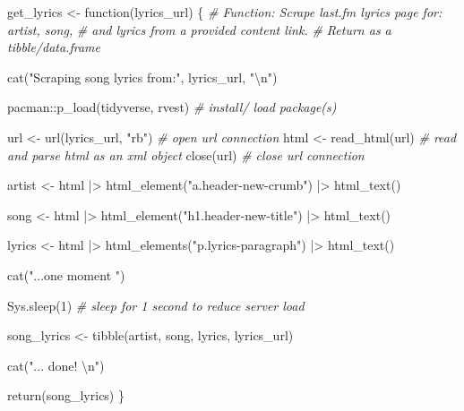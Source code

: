 \documentclass[
  letterpaper,
]{scrbook}
\newenvironment{Shaded}{\begin{snugshade}}{\end{snugshade}}
\newcommand{\CommentTok}[1]{\textcolor[rgb]{0.00,0.00,0.00}{\textit{#1}}}
\newcommand{\ControlFlowTok}[1]{\textcolor[rgb]{0.00,0.00,0.00}{#1}}
\newcommand{\DecValTok}[1]{\textcolor[rgb]{0.00,0.00,0.00}{#1}}
\newcommand{\FunctionTok}[1]{\textcolor[rgb]{0.00,0.00,0.00}{#1}}
\newcommand{\NormalTok}[1]{\textcolor[rgb]{0.00,0.00,0.00}{#1}}
\newcommand{\OtherTok}[1]{\textcolor[rgb]{0.00,0.00,0.00}{#1}}
\newcommand{\SpecialCharTok}[1]{\textcolor[rgb]{0.00,0.00,0.00}{#1}}
\newcommand{\StringTok}[1]{\textcolor[rgb]{0.00,0.00,0.00}{#1}}
\begin{document}
\begin{Shaded}
\begin{Highlighting}[]
\NormalTok{get\_lyrics }\OtherTok{\textless{}{-}} \ControlFlowTok{function}\NormalTok{(lyrics\_url) \{}
  \CommentTok{\# Function: Scrape last.fm lyrics page for: artist, song, }
  \CommentTok{\# and lyrics from a provided content link. }
  \CommentTok{\# Return as a tibble/data.frame}
  
  \FunctionTok{cat}\NormalTok{(}\StringTok{"Scraping song lyrics from:"}\NormalTok{, lyrics\_url, }\StringTok{"}\SpecialCharTok{\textbackslash{}n}\StringTok{"}\NormalTok{)}
  
\NormalTok{  pacman}\SpecialCharTok{::}\FunctionTok{p\_load}\NormalTok{(tidyverse, rvest) }\CommentTok{\# install/ load package(s)}
  
\NormalTok{  url }\OtherTok{\textless{}{-}} \FunctionTok{url}\NormalTok{(lyrics\_url, }\StringTok{"rb"}\NormalTok{) }\CommentTok{\# open url connection }
\NormalTok{  html }\OtherTok{\textless{}{-}} \FunctionTok{read\_html}\NormalTok{(url) }\CommentTok{\# read and parse html as an xml object}
  \FunctionTok{close}\NormalTok{(url) }\CommentTok{\# close url connection}
  
\NormalTok{  artist }\OtherTok{\textless{}{-}} 
\NormalTok{    html }\SpecialCharTok{|\textgreater{}} 
    \FunctionTok{html\_element}\NormalTok{(}\StringTok{"a.header{-}new{-}crumb"}\NormalTok{) }\SpecialCharTok{|\textgreater{}} 
    \FunctionTok{html\_text}\NormalTok{()}
  
\NormalTok{  song }\OtherTok{\textless{}{-}} 
\NormalTok{    html }\SpecialCharTok{|\textgreater{}} 
    \FunctionTok{html\_element}\NormalTok{(}\StringTok{"h1.header{-}new{-}title"}\NormalTok{) }\SpecialCharTok{|\textgreater{}} 
    \FunctionTok{html\_text}\NormalTok{()}
  
\NormalTok{  lyrics }\OtherTok{\textless{}{-}} 
\NormalTok{    html }\SpecialCharTok{|\textgreater{}} 
    \FunctionTok{html\_elements}\NormalTok{(}\StringTok{"p.lyrics{-}paragraph"}\NormalTok{) }\SpecialCharTok{|\textgreater{}} 
    \FunctionTok{html\_text}\NormalTok{()}
  
  \FunctionTok{cat}\NormalTok{(}\StringTok{"...one moment "}\NormalTok{)}
  
  \FunctionTok{Sys.sleep}\NormalTok{(}\DecValTok{1}\NormalTok{) }\CommentTok{\# sleep for 1 second to reduce server load}
  
\NormalTok{  song\_lyrics }\OtherTok{\textless{}{-}} \FunctionTok{tibble}\NormalTok{(artist, song, lyrics, lyrics\_url)}
  
  \FunctionTok{cat}\NormalTok{(}\StringTok{"... done! }\SpecialCharTok{\textbackslash{}n}\StringTok{"}\NormalTok{)}
  
  \FunctionTok{return}\NormalTok{(song\_lyrics)}
\NormalTok{\}}
\end{Highlighting}
\end{Shaded}
\end{document}
